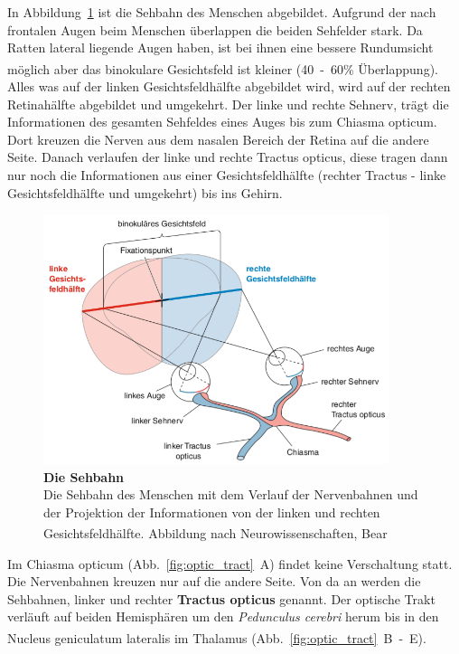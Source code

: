\documentclass[12pt,a4paper,pdftex]{article}
\begin{document}
In Abbildung~\ref{fig:sehbahn_baer} ist die Sehbahn des Menschen abgebildet. Aufgrund der nach frontalen Augen beim Menschen überlappen die beiden Sehfelder stark. Da Ratten lateral liegende Augen haben, ist bei ihnen eine bessere Rundumsicht möglich aber das binokulare Gesichtsfeld ist kleiner (40~-~60\% Überlappung). \textsuperscript{\cite[30]{paxinos2014rat}}
Alles was auf der linken Gesichtsfeldhälfte abgebildet wird, wird auf der rechten Retinahälfte abgebildet und umgekehrt. Der linke und rechte Sehnerv, trägt die Informationen des gesamten Sehfeldes eines Auges bis zum Chiasma opticum. Dort kreuzen die Nerven aus dem nasalen Bereich der Retina auf die andere Seite. Danach verlaufen der linke und rechte Tractus opticus,  diese tragen dann nur noch die Informationen aus einer Gesichtsfeldhälfte (rechter Tractus - linke Gesichtsfeldhälfte und umgekehrt) bis ins Gehirn.

\begin{figure}[H]
    \centering
    \includegraphics[width = 0.9\textwidth]{pictures/visual/Sehbahn.png}
    \caption[Die Sehbahn]{\textbf{Die Sehbahn}\\
    Die Sehbahn des Menschen mit dem Verlauf der Nervenbahnen und der Projektion der Informationen von der linken und rechten Gesichtsfeldhälfte.
    Abbildung nach Neurowissenschaften, Bear \textsuperscript{\cite[10]{neurowissenschaften_baer}}}
    \label{fig:sehbahn_baer}
\end{figure}

Im Chiasma opticum (Abb.~\ref{fig:optic_tract}~A) findet keine Verschaltung statt. Die Nervenbahnen kreuzen nur auf die andere Seite. Von da an werden die Sehbahnen, linker und rechter \textbf{Tractus opticus}  genannt. Der optische Trakt verläuft auf beiden Hemisphären um den \textit{Pedunculus cerebri} herum bis in den Nucleus geniculatum lateralis im Thalamus (Abb.~\ref{fig:optic_tract}~B~-~E). \textsuperscript{\cite[15]{crossman2014neuroanatomy}}
\end{document}
